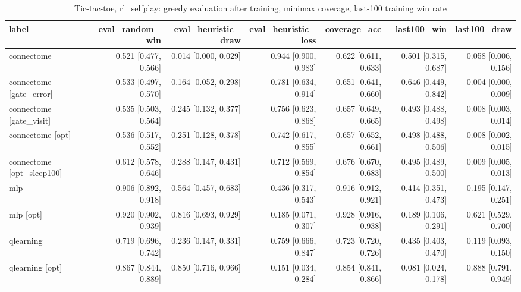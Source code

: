 \begin{table}[t]
\centering
\small
\begin{tabular}{lrrrrrr}
\toprule
label & eval\_random\_win & eval\_heuristic\_draw & eval\_heuristic\_loss & coverage\_acc & last100\_win & last100\_draw \\
\midrule
connectome & 0.521 [0.477, 0.566] & 0.014 [0.000, 0.029] & 0.944 [0.900, 0.983] & 0.622 [0.611, 0.633] & 0.501 [0.315, 0.687] & 0.058 [0.006, 0.156] \\
connectome [gate\_error] & 0.533 [0.497, 0.570] & 0.164 [0.052, 0.298] & 0.781 [0.634, 0.914] & 0.651 [0.641, 0.660] & 0.646 [0.449, 0.842] & 0.004 [0.000, 0.009] \\
connectome [gate\_visit] & 0.535 [0.503, 0.564] & 0.245 [0.132, 0.377] & 0.756 [0.623, 0.868] & 0.657 [0.649, 0.665] & 0.493 [0.488, 0.498] & 0.008 [0.003, 0.014] \\
connectome [opt] & 0.536 [0.517, 0.552] & 0.251 [0.128, 0.378] & 0.742 [0.617, 0.855] & 0.657 [0.652, 0.661] & 0.498 [0.488, 0.506] & 0.008 [0.002, 0.015] \\
connectome [opt\_sleep100] & 0.612 [0.578, 0.646] & 0.288 [0.147, 0.431] & 0.712 [0.569, 0.854] & 0.676 [0.670, 0.683] & 0.495 [0.489, 0.500] & 0.009 [0.005, 0.013] \\
mlp & 0.906 [0.892, 0.918] & 0.564 [0.457, 0.683] & 0.436 [0.317, 0.543] & 0.916 [0.912, 0.921] & 0.414 [0.351, 0.473] & 0.195 [0.147, 0.251] \\
mlp [opt] & 0.920 [0.902, 0.939] & 0.816 [0.693, 0.929] & 0.185 [0.071, 0.307] & 0.928 [0.916, 0.938] & 0.189 [0.106, 0.291] & 0.621 [0.529, 0.700] \\
qlearning & 0.719 [0.696, 0.742] & 0.236 [0.147, 0.331] & 0.759 [0.666, 0.847] & 0.723 [0.720, 0.726] & 0.435 [0.403, 0.470] & 0.119 [0.093, 0.150] \\
qlearning [opt] & 0.867 [0.844, 0.889] & 0.850 [0.716, 0.966] & 0.151 [0.034, 0.284] & 0.854 [0.841, 0.866] & 0.081 [0.024, 0.178] & 0.888 [0.791, 0.949] \\
\bottomrule
\end{tabular}
\caption{Tic-tac-toe, rl\_selfplay: greedy evaluation after training, minimax coverage, last-100 training win rate}
\label{tab:tictactoe_rl_selfplay}
\end{table}